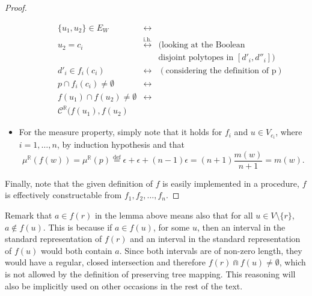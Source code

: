 \documentclass{article}
\newcommand{\R}{\mathbb{R}}
\newcommand{\bcap}{\Cap}
\newcommand{\bcont}{\mathcal{C}^\R}
\newcommand{\eqdef}{\stackrel{\text{def}}{=}}
\newcommand{\equivih}{\stackrel{\text{i.h.}}{\leftrightarrow}}
\begin{document}
\begin{proof}
\begin{itemize}
\begin{itemize}
      \begin{align*}
        \{u_1, u_2\} \in E_W &\leftrightarrow \\
        u_2 = c_i &\equivih & (\text{looking at the Boolean} \\
        &&\text{disjoint polytopes in } [d'_i, d''_i]) \\
        d'_i \in f_i(c_i) &\leftrightarrow &(\text{considering the definition of p}) \\
        p \cap f_i(c_i) \neq \emptyset &\leftrightarrow \\
        f(u_1) \cap f(u_2) \neq \emptyset &\leftrightarrow \\
        \bcont(f(u_1), f(u_2)
      \end{align*}
    \end{itemize}
  \item For the measure property, simply note that it holds for $f_i$ and $u \in V_{c_i}$, where $i = 1, \dots, n$, by induction hypothesis and that
    \begin{equation*}
      \mu^\R(f(w)) = \mu^\R(p) \eqdef \epsilon + \epsilon + (n - 1)\epsilon = (n+1) \frac{m(w)}{n + 1} = m(w).
    \end{equation*}
  \end{itemize}
Finally, note that the given definition of $f$ is easily implemented in a procedure, $f$ is effectively constructable from $f_1, f_2, \dots, f_n$.
\end{proof}

Remark that $a \in f(r)$ in the lemma above means also that for all $u \in V \setminus \{r\}$, $a \not \in f(u)$. This is because if $a \in f(u)$, for some $u$, then an interval in the standard representation of $f(r)$ and an interval in the standard representation of $f(u)$ would both contain $a$. Since both intervals are of non-zero length, they would have a regular, closed intersection and therefore $f(r) \bcap f(u) \neq \emptyset$, which is not allowed by the definition of preserving tree mapping. This reasoning will also be implicitly used on other occasions in the rest of the text.
\end{document}
